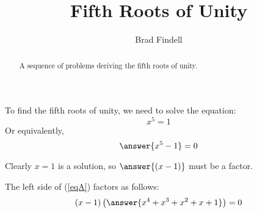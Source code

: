 \documentclass[space,nooutcomes]{ximera}
\title{Fifth Roots of Unity}
\author{Brad Findell}
\begin{document}
\begin{abstract}
A sequence of problems deriving the fifth roots of unity.   
\end{abstract}
\maketitle



\begin{problem}

To find the fifth roots of unity, we need to solve the equation: 
\begin{equation}
x^5 = 1
\end{equation}
Or equivalently, 
\begin{equation} \label{eqA}
\answer{x^5 - 1} = 0
\end{equation}

\begin{problem}
Clearly $x=1$ is a solution, so $\answer{(x-1)}$ must be a factor.  

\begin{problem}
The left side of (\ref{eqA}) factors as follows: 
\begin{equation}
(x-1)\left(\answer{x^4+x^3+x^2+x+1}\right)=0
\end{equation}
\end{problem}
\end{problem}
\end{problem}
\end{document}
